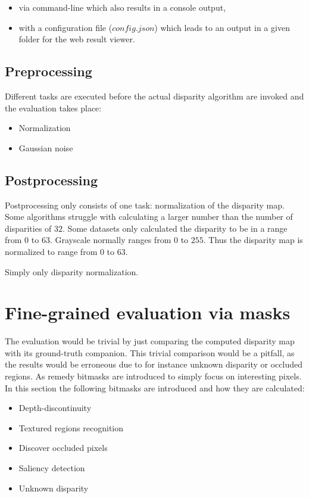 \begin{itemize}
  \item via command-line which also results in a console output,
  \item with a configuration file ($config.json$) which leads to an output in a given folder for the web result viewer.
\end{itemize}

\subsection*{Preprocessing}

Different tasks are executed before the actual disparity algorithm are invoked and the evaluation takes place:

\begin{itemize}
  \item Normalization
  \item Gaussian noise
\end{itemize}

\subsection*{Postprocessing}

Postprocessing only consists of one task: normalization of the disparity map.
Some algorithms struggle with calculating a larger number than the number of disparities of $32$.
Some datasets only calculated the disparity to be in a range from $0$ to $63$.
Grayscale normally ranges from $0$ to $255$.
Thus the disparity map is normalized to range from $0$ to $63$.

Simply only disparity normalization.

\section{Fine-grained evaluation via masks}

The evaluation would be trivial by just comparing the computed disparity map with its ground-truth companion.
This trivial comparison would be a pitfall, as the results would be erroneous due to for instance unknown disparity or occluded regions.
As remedy bitmasks are introduced to simply focus on interesting pixels.
In this section the following bitmasks are introduced and how they are calculated:

\begin{itemize}
  \item Depth-discontinuity
  \item Textured regions recognition
  \item Discover occluded pixels
  \item Saliency detection
  \item Unknown disparity
\end{itemize}

